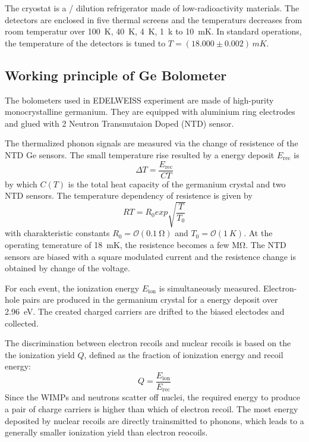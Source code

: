   The cryostat is a / dilution refrigerator made of low-radioactivity materials. The detectors are enclosed in five thermal screens and the temperaturs decreases from room temperatur over \SI{100}{K}, \SI{40}{K}, \SI{4}{K}, \SI{1}{k} to \SI{10}{mK}. In standard operations, the temperature of the detectors is tuned to $T=(18.000 \pm 0.002)\,\si{mK}$.

\subsection{Working principle of Ge Bolometer}
  \label{edw-ge}
  The bolometers used in EDELWEISS experiment are made of high-purity monocrystalline germanium. They are equipped with aluminium ring electrodes and glued with 2 Neutron Transmutaion Doped (NTD) sensor.

  The thermalized phonon signals are measured via the change of resistence of the NTD Ge sensors. The small temperature rise resulted by a energy deposit $E_{\mathrm{rec}}$ is
  \begin{equation}
      \Delta T = \frac{E_{\mathrm{rec}}}{C{T}}
  \end{equation}
  by which $C(T)$ is the total heat capacity of the germanium crystal and two NTD sensors. The temperature dependency of resistence is given by
  \begin{equation}
    R{T}=R_{0}exp\sqrt{\frac{T}{T_{0}}}
  \end{equation}
  with charakteristic constants $R_{0}=\mathcal{O}(\SI{0.1}{\ohm})$ and $T_{0}=\mathcal{O}(\SI{1}{K})$. At the operating temerature of \SI{18}{mK}, the resistence becomes a few \si{\mega\ohm}. The NTD sensors are biased with a square modulated current and the resistence change is obtained by change of the voltage.%

  For each event, the ionization energy $E_{\mathrm{ion}}$ is simultaneously measured. Electron-hole pairs are produced in the germanium crystal for a energy deposit over \SI{2.96}{eV}.%
  The created charged carriers are drifted to the biased electodes and collected.

  The discrimination between electron recoils and nuclear recoils is based on the the ionization yield $Q$, defined as the fraction of ionization energy and recoil energy:
  \begin{equation}
    Q=\frac{E_{\mathrm{ion}}}{E_{\mathrm{rec}}}
  \end{equation}
  Since the WIMPs and neutrons scatter off nuclei, the required energy to produce a pair of charge carriers is higher than which of electron recoil. The most energy deposited by nuclear recoils are directly trainsmitted to phonons, which leads to a generally smaller ionization yield than electron reocoils.

